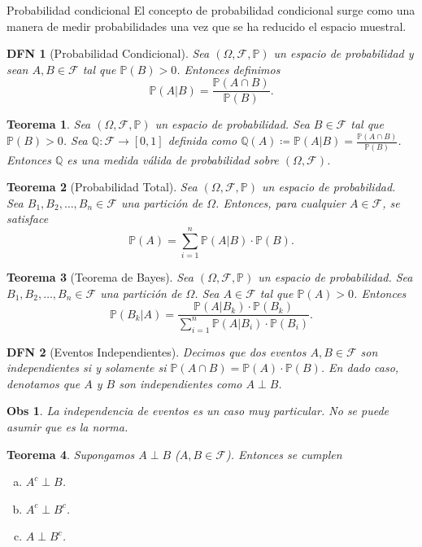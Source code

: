 \documentclass[a4paper]{article}
\newtheorem{definition}{DFN}
\theoremstyle{mytheoremstyle}
\newtheorem{theorem}{Teorema}
\newtheorem*{obs}{Obs}
\newcommand{\IP}{\mathbb{P}}
\newcommand{\F}{\mathcal{F}}
\newcommand{\1}{\mathds{1}}
\begin{document}
\begin{multicols*}{3}
\columnbreak

\begin{roundbox}{Probabilidad condicional}
El concepto de probabilidad condicional surge como una manera de medir probabilidades una vez que se ha reducido el espacio muestral.

\begin{definition}[Probabilidad Condicional] 
    Sea $(\Omega, \F, \IP)$ un espacio de probabilidad y sean $A, B \in \F$ tal que $\IP(B) > 0$. Entonces definimos
    \[
        \IP(A | B) = \frac{\IP(A \cap B)}{\IP(B)}.
    \]
\end{definition}

\begin{theorem}
    Sea $(\Omega, \F, \IP)$ un espacio de probabilidad. Sea $B \in \F$ tal que $\IP(B) > 0$. Sea $\mathbb{Q}: \F \to [0,1]$ definida como $\mathbb{Q}(A) \coloneqq \IP(A|B) = \frac{\IP(A \cap B)}{\IP(B)}$. Entonces $\mathbb{Q}$ es una medida válida de probabilidad sobre $(\Omega, \F)$.
\end{theorem}

\begin{theorem}[Probabilidad Total]
    Sea $(\Omega, \F, \IP)$ un espacio de probabilidad. Sea $B_1, B_2, \dots, B_n \in \F$ una partición de $\Omega$. Entonces, para cualquier $A\in \F$, se satisface
    \[
        \IP(A) = \sum_{i=1}^{n} \IP(A|B) \cdot \IP(B).  
    \] 
\end{theorem}

\begin{theorem}[Teorema de Bayes]
    Sea $(\Omega, \F, \IP)$ un espacio de probabilidad. Sea $B_1, B_2, \dots, B_n \in \F$ una partición de $\Omega$. Sea $A \in \F$ tal que $\IP(A) > 0$. Entonces
    \[
        \IP(B_k | A) = \frac{\IP(A|B_k) \cdot \IP(B_k)}{\sum_{i=1}^{n} \IP(A|B_i) \cdot \IP(B_i)} .
    \]
\end{theorem}

\begin{definition}[Eventos Independientes] 
    Decimos que dos eventos $A, B \in \F$ son independientes si y solamente si $\IP(A\cap B) = \IP(A) \cdot \IP(B)$. En dado caso, denotamos que $A$ y $B$ son independientes como $A \perp B$.
\end{definition}

\begin{obs}
    La independencia de eventos es un caso muy particular. No se puede asumir que es la norma.
\end{obs}

\begin{theorem}
    Supongamos $A\perp B$ ($A,B \in \F$). Entonces se cumplen
    \begin{enumerate}[a)]
        \item $A^c \perp B$.
        \item $A^c \perp B^c$.
        \item $A \perp B^c$.
    \end{enumerate}
\end{theorem}
\end{roundbox}


\end{multicols*}
\end{document}
